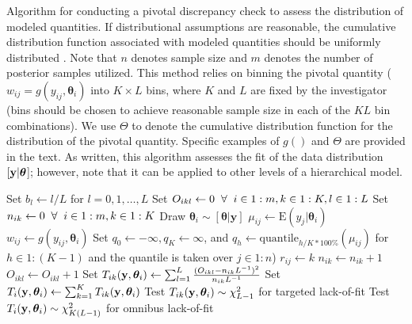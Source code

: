 \documentclass[12pt,english]{article}
\def\VAR{{\rm Var}\,}
\def\bftheta{\boldsymbol{\theta}}
\begin{document}
\begin{flushleft}
\begin{algorithm}
\caption{Algorithm for conducting a pivotal discrepancy check to assess the distribution of modeled quantities.  If distributional assumptions are reasonable, the cumulative distribution function associated with modeled quantities should be uniformly distributed \citep{Johnson2004,YuanJohnson2012}. Note that $n$ denotes sample size and $m$ denotes the number of posterior samples utilized.  This method relies on binning the pivotal quantity ($w_{ij} = g(y_{ij},\boldsymbol{\theta}_i)$ into $K \times L$ bins, where $K$ and $L$ are fixed by the investigator (bins should be chosen to achieve reasonable sample size in each of the $KL$ bin combinations).  We use $\Theta$ to denote the cumulative distribution function for the distribution of the pivotal quantity.  Specific examples of $g()$ and $\Theta$ are provided in the text.  As written, this algorithm assesses the fit of the data distribution $[{\bf y}|\boldsymbol{\theta}$]; however, note that it can be applied to other levels of a hierarchical model.}
\label{alg:pivot}
\begin{algorithmic}
\STATE Set $b_l \leftarrow l/L$ for $l=0,1,\hdots,L$
\STATE Set $O_{ikl} \leftarrow 0 \hspace{2mm} \forall \hspace{2mm} i \in 1:m, k \in 1:K, l \in 1:L$
\STATE Set $n_{ik} \leftarrow 0 \hspace{2mm} \forall \hspace{2mm} i \in 1:m, k \in 1:K$
  \STATE Draw $\boldsymbol{\theta}_i \sim [\boldsymbol{\theta}|\textbf{y}]$
    \STATE $\mu_{ij} \leftarrow \textrm{E}(y_j|\boldsymbol{\theta}_i)$
    \STATE $w_{ij} \leftarrow g(y_{ij},\boldsymbol{\theta}_i)$
  \ENDFOR
  \STATE Set $q_0 \leftarrow -\infty, q_{K} \leftarrow \infty$, and $q_h \leftarrow \textrm{quantile}_{h/K*100\%}(\mu_{ij})$ for $h \in 1:(K-1)$ and the quantile is taken over $j \in 1:n$)
        \STATE $r_{ij} \leftarrow k$
        \STATE $n_{ik} \leftarrow n_{ik}+1$
      \ENDIF
    \ENDFOR
      \IF{$\Theta(w_{ij}) \in (b_{l-1},b_l]$ \& $r_{ij}=k$}
        \STATE $O_{ikl} \leftarrow O_{ikl}+1$
      \ENDIF
    \ENDFOR
    \STATE Set $T_{ik}({\bf y},\bftheta_i) \leftarrow \sum_{l=1}^L \frac{(O_{ikl}-n_{ik}L^{-1})^2}{n_{ik}L^{-1}} $
  \ENDFOR
  \STATE Set $T_i({\bf y},\bftheta_i) \leftarrow \sum_{k=1}^K T_{ik}({\bf y},\bftheta_i)$
\ENDFOR
\STATE Test $T_{ik}({\bf y},\bftheta_i) \sim \chi^2_{L-1}$ for targeted lack-of-fit
\STATE Test $T_{i}({\bf y},\bftheta_i) \sim \chi^2_{K(L-1)}$ for omnibus lack-of-fit
\end{algorithmic}
\end{algorithm}



\end{flushleft}
\end{document}
